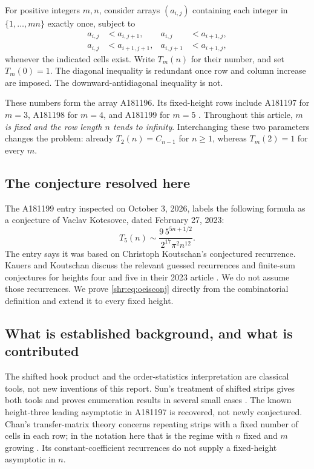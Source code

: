 \documentclass[11pt,letterpaper]{article}
\numberwithin{equation}{section}
\theoremstyle{definition}
\newcommand{\1}{\mathbf 1}
\begin{document}
For positive integers $m,n$, consider arrays $(a_{i,j})$ containing each
integer in $\{1,\ldots,mn\}$ exactly once, subject to
\begin{align}
 a_{i,j}&<a_{i,j+1},&a_{i,j}&<a_{i+1,j},\\
 a_{i,j}&<a_{i+1,j+1},&a_{i,j+1}&<a_{i+1,j},
 \label{shr:eq:arrayconditions}
\end{align}
whenever the indicated cells exist. Write $T_m(n)$ for their number, and
set $T_m(0)=1$. The diagonal inequality is redundant once row and column
increase are imposed. The downward-antidiagonal inequality is not.

These numbers form the array A181196. Its fixed-height rows include
A181197 for $m=3$, A181198 for $m=4$, and A181199 for $m=5$
\cite{oeis196,oeis197,oeis198,oeis199}. Throughout this article, \emph{$m$ is
fixed and the row length $n$ tends to infinity}. Interchanging these two
parameters changes the problem: already $T_2(n)=C_{n-1}$ for $n\ge1$,
whereas $T_m(2)=1$ for every $m$.

\subsection{The conjecture resolved here}
The A181199 entry inspected on October 3, 2026, labels the following formula
as a conjecture of Vaclav Kotesovec, dated February 27, 2023:
\begin{equation}
 T_5(n)\sim \frac{9\,5^{5n+1/2}}{2^{17}\pi^2n^{12}}.
 \label{shr:eq:oeisconj}
\end{equation}
The entry says it was based on Christoph Koutschan's conjectured recurrence.
Kauers and Koutschan discuss the relevant guessed recurrences and finite-sum
conjectures for heights four and five in their 2023 article
\cite{KK,oeis199}. We do not assume those recurrences. We prove
\eqref{shr:eq:oeisconj} directly from the combinatorial definition and extend it
to every fixed height.

\subsection{What is established background, and what is contributed}
The shifted hook product and the order-statistics interpretation are
classical tools, not new inventions of this report. Sun's treatment of
shifted strips gives both tools and proves enumeration results in several
small cases \cite{Sun}. The known height-three leading asymptotic in
A181197 is recovered, not newly conjectured. Chan's transfer-matrix theory
concerns repeating strips with a fixed number of cells in each row; in the
notation here that is the regime with $n$ fixed and $m$ growing
\cite{Chan}. Its constant-coefficient recurrences do not supply a
fixed-height asymptotic in $n$.
\end{document}
